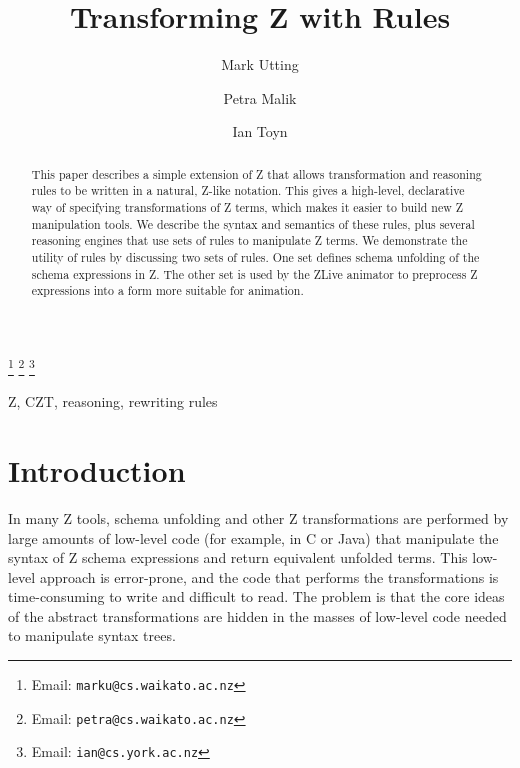 \documentclass{entcs}
\begin{document}
\begin{frontmatter}
  \title{Transforming Z with Rules}
  \author{Mark Utting}
  \address{Department of Computer Science\\
    The University of Waikato\\
    Hamilton, New Zealand} 
  \author{Petra Malik}
  \address{Department of Computer Science\\
    The University of Waikato\\
    Hamilton, New Zealand} 
  \author{Ian Toyn}
  \address{Department of Computer Science\\
    The University of York\\
    Heslington, York, UK}
  \thanks[emailMark]{Email: \texttt{marku@cs.waikato.ac.nz}}
  \thanks[emailPetra]{Email: \texttt{petra@cs.waikato.ac.nz}}
  \thanks[emailIan]{Email: \texttt{ian@cs.york.ac.nz}}
\begin{abstract}
  This paper describes a simple extension of Z that allows transformation
  and reasoning rules to be written in a natural, Z-like notation.  This
  gives a high-level, declarative way of specifying transformations of Z
  terms, which makes it easier to build new Z manipulation tools.
  We describe the syntax and semantics of these rules, plus several reasoning
  engines that use sets of rules to manipulate Z terms.  We demonstrate the
  utility of rules by discussing two sets of rules.  One set defines schema
  unfolding of the schema expressions in Z.  The other set is used by
  the ZLive animator to preprocess Z expressions into a form more suitable
  for animation.  
\end{abstract}
\begin{keyword}
  Z, CZT, reasoning, rewriting rules
\end{keyword}
\end{frontmatter}



\section{Introduction}

In many Z tools, schema unfolding and other Z transformations are performed
by large amounts of low-level code (for example, in C or Java) that
manipulate the syntax of Z schema expressions and return equivalent
unfolded terms.  This low-level approach is error-prone, and the code that
performs the transformations is time-consuming to write and difficult to
read.  The problem is that the core ideas of the abstract transformations are
hidden in the masses of low-level code needed to manipulate syntax trees.
\end{document}
